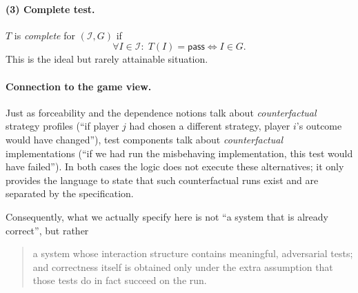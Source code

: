 \paragraph{(3) Complete test.}
$T$ is \emph{complete} for $(\mathcal I,G)$ if
\[
  \forall I \in \mathcal I:\;
  T(I) = \mathsf{pass} \iff I \in G.
\]
This is the ideal but rarely attainable situation.

\paragraph{Connection to the game view.}
Just as forceability and the dependence notions talk about \emph{counterfactual}
strategy profiles (``if player $j$ had chosen a different strategy, player $i$'s
outcome would have changed''), test components talk about \emph{counterfactual}
implementations (``if we had run the misbehaving implementation, this test would
have failed''). In both cases the logic does not execute these alternatives; it
only provides the language to state that such counterfactual runs exist and are
separated by the specification.

Consequently, what we actually specify here is not ``a system that is already
correct'', but rather
\begin{quote}
a system whose interaction structure contains meaningful, adversarial tests;
and correctness itself is obtained only under the extra assumption that those
tests do in fact succeed on the run.
\end{quote}
